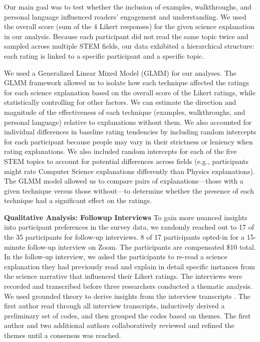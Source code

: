 Our main goal was to test whether the inclusion of examples, walkthroughs, and personal language influenced readers' engagement and understanding. We used the overall score (sum of the 4 Likert responses) for the given science explanation in our analysis. Because each participant did not read the same topic twice and sampled across multiple STEM fields, our data exhibited a hierarchical structure: each rating is linked to a specific participant and a specific topic.

We used a Generalized Linear Mixed Model (GLMM) for our analyses. The GLMM framework allowed us to isolate how each technique affected the ratings for each science explanation based on the overall score of the Likert ratings, while statistically controlling for other factors. We can estimate the direction and magnitude of the effectiveness of each technique (examples, walkthroughs, and personal language) relative to explanations without them. We also accounted for individual differences in baseline rating tendencies by including random intercepts for each participant because people may vary in their strictness or leniency when rating explanations. We also included random intercepts for each of the five STEM topics to account for potential differences across fields (e.g., participants might rate Computer Science explanations differently than Physics explanations). The GLMM model allowed us to compare pairs of explanations—those with a given technique versus those without—to determine whether the presence of each technique had a significant effect on the ratings.
  

\textbf{Qualitative Analysis: Followup Interviews}
To gain more nuanced insights into participant preferences in the survey data, we randomly reached out to 17 of the 35 participants for follow-up interviews. 8 of 17 participants opted-in for a 15-minute follow-up interview on Zoom. The participants are compensated \$10 total. In the follow-up interview, we asked the participants to re-read a science explanation they had previously read and explain in detail specific instances from the science narrative that influenced their Likert ratings.  The interviews were recorded and transcribed before three researchers conducted a thematic analysis. We used grounded theory to derive insights from the interview transcripts \cite{charmaz_constructing_2006}. The first author read through all interview transcripts, inductively derived a preliminary set of codes, and then grouped the codes based on themes. The first author and two additional authors collaboratively reviewed and refined the themes until a consensus was reached.

